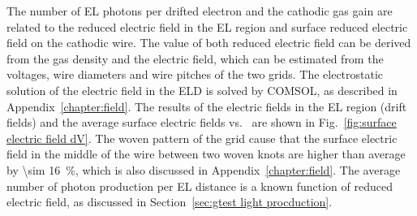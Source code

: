 The number of EL photons per drifted electron and the cathodic gas gain are related to the reduced electric field in the EL region and surface reduced electric field on the cathodic wire. The value of both reduced electric field can be derived from the gas density and the electric field, which can be estimated from the voltages, wire diameters and wire pitches of the two grids. The electrostatic solution of the electric field in the ELD is solved by COMSOL, as described in Appendix~\ref{chapter:field}. The results of the electric fields in the EL region (drift fields) and the average surface electric fields vs. \opdv\ are shown in Fig.~\ref{fig:surface electric field dV}.  The woven pattern of the grid cause that the surface electric field in the middle of the wire between two woven knots are higher than average by \SI{\sim 16}{\percent}, which is also discussed in Appendix~\ref{chapter:field}. The average number of photon production per EL distance is a known function of reduced electric field, as discussed in Section~\ref{sec:gtest light procduction}.%
